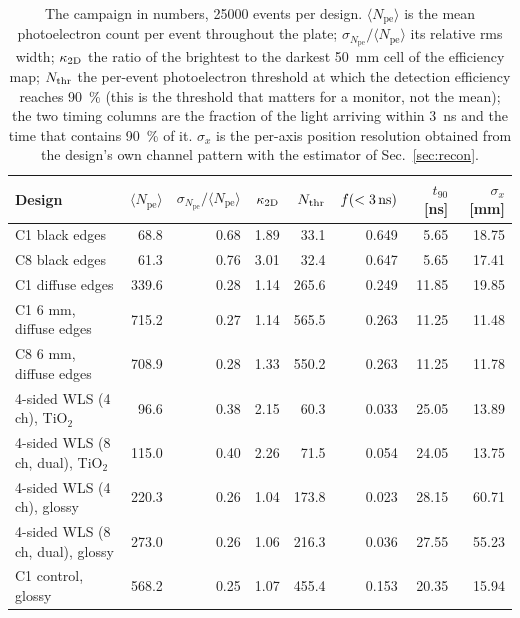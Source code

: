 \documentclass[11pt,a4paper]{article}
\newcommand{\pe}{\ensuremath{N_{\mathrm{pe}}}}
\newcommand{\kap}{\ensuremath{\kappa_{\rm 2D}}}
\begin{document}
\begin{table}[H]
\caption{The campaign in numbers, \num{25000} events per design.
$\langle\pe\rangle$ is the mean photoelectron count per event throughout the
plate; $\sigma_{\pe}/\langle\pe\rangle$ its relative rms width;
$\kappa_{\rm 2D}$ the ratio of the brightest to the darkest \SI{50}{\milli\meter}
cell of the efficiency map; $N_{\rm thr}$ the per-event photoelectron
threshold at which the detection efficiency reaches \SI{90}{\percent} (this
is the threshold that matters for a monitor, not the mean); the two timing
columns are the fraction of the light arriving within \SI{3}{\nano\second}
and the time that contains \SI{90}{\percent} of it. $\sigma_x$ is the
per-axis position resolution obtained from the design's own channel pattern
with the estimator of Sec.~\ref{sec:recon}.}
\label{tab:designres}
\small
\setlength{\tabcolsep}{4pt}
\begin{tabular}{@{}lrrrrrrr@{}}
\toprule
Design & $\langle\pe\rangle$ & $\sigma_{\pe}/\langle\pe\rangle$ & $\kap$ &
$N_{\rm thr}$ & $f(<3\,{\rm ns})$ & $t_{90}$ [\si{\nano\second}] & $\sigma_x$ [\si{\milli\meter}] \\
\midrule
C1 black edges                     & \num{68.8}  & \num{0.68} & \num{1.89} & \num{33.1}  & \num{0.649} & \num{5.65}  & \num{18.75} \\
C8 black edges                     & \num{61.3}  & \num{0.76} & \num{3.01} & \num{32.4}  & \num{0.647} & \num{5.65}  & \num{17.41} \\
\midrule
C1 diffuse edges                   & \num{339.6} & \num{0.28} & \num{1.14} & \num{265.6} & \num{0.249} & \num{11.85} & \num{19.85} \\
C1 6 mm, diffuse edges             & \num{715.2} & \num{0.27} & \num{1.14} & \num{565.5} & \num{0.263} & \num{11.25} & \num{11.48} \\
C8 6 mm, diffuse edges             & \num{708.9} & \num{0.28} & \num{1.33} & \num{550.2} & \num{0.263} & \num{11.25} & \num{11.78} \\
\midrule
4-sided WLS (4 ch), TiO$_2$        & \num{96.6}  & \num{0.38} & \num{2.15} & \num{60.3}  & \num{0.033} & \num{25.05} & \num{13.89} \\
4-sided WLS (8 ch, dual), TiO$_2$  & \num{115.0} & \num{0.40} & \num{2.26} & \num{71.5}  & \num{0.054} & \num{24.05} & \num{13.75} \\
4-sided WLS (4 ch), glossy         & \num{220.3} & \num{0.26} & \num{1.04} & \num{173.8} & \num{0.023} & \num{28.15} & \num{60.71} \\
4-sided WLS (8 ch, dual), glossy   & \num{273.0} & \num{0.26} & \num{1.06} & \num{216.3} & \num{0.036} & \num{27.55} & \num{55.23} \\
\midrule
C1 control, glossy                 & \num{568.2} & \num{0.25} & \num{1.07} & \num{455.4} & \num{0.153} & \num{20.35} & \num{15.94} \\
\bottomrule
\end{tabular}
\end{table}
\end{document}

